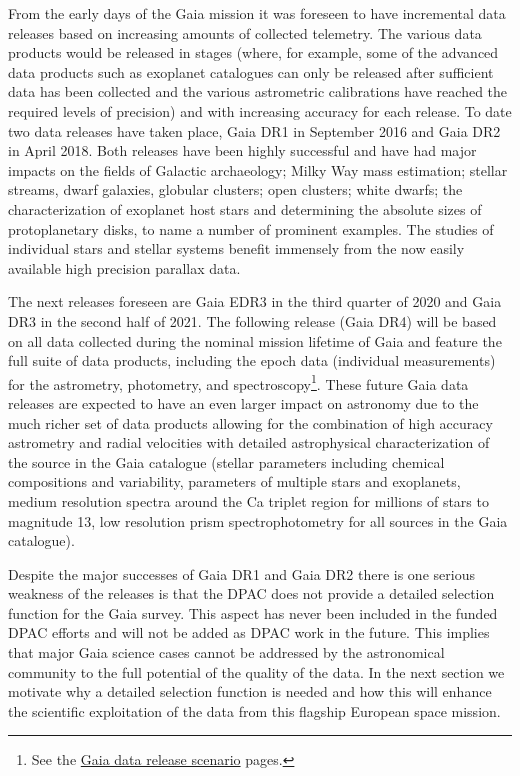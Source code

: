 From the early days of the Gaia mission it was foreseen to have incremental data releases based on increasing amounts of collected telemetry. The various data products would be released in stages (where, for example, some of the advanced data products such as exoplanet catalogues can only be released after sufficient data has been collected and the various astrometric calibrations have reached the required levels of precision) and with increasing accuracy for each release. To date two data releases have taken place, Gaia DR1 in September 2016 and Gaia DR2 in April 2018. Both releases have been highly successful and have had major impacts on the fields of Galactic archaeology; Milky Way mass estimation; stellar streams, dwarf galaxies, globular clusters; open clusters; white dwarfs; the characterization of exoplanet host stars and determining the absolute sizes of protoplanetary disks, to name a number of prominent examples. The studies of individual stars and stellar systems benefit immensely from the now easily available high precision parallax data.

The next releases foreseen are Gaia EDR3 in the third quarter of 2020 and Gaia DR3 in the second half of 2021. The following release (Gaia DR4) will be based on all data collected during the nominal mission lifetime of Gaia and feature the full suite of data products, including the epoch data (individual measurements) for the astrometry, photometry, and spectroscopy\footnote{See the \href{https://www.cosmos.esa.int/web/gaia/release}{Gaia data release scenario} pages.}. These future Gaia data releases are expected to have an even larger impact on astronomy due to the much richer set of data products allowing for the combination of high accuracy astrometry and radial velocities with detailed astrophysical characterization of the source in the Gaia catalogue (stellar parameters including chemical compositions and variability, parameters of multiple stars and exoplanets, medium resolution spectra around the Ca triplet region for millions of stars to magnitude 13, low resolution prism spectrophotometry for all sources in the Gaia catalogue). 

Despite the major successes of Gaia DR1 and Gaia DR2 there is one serious weakness of the releases is that the DPAC does not provide a detailed selection function for the Gaia survey. This aspect has never been included in the funded DPAC efforts and will not be added as DPAC work in the future. This implies that major Gaia science cases cannot be addressed by the astronomical community to the full potential of the quality of the data. In the next section we motivate why a detailed selection function is needed and how this will enhance the scientific exploitation of the data from this flagship European space mission.

